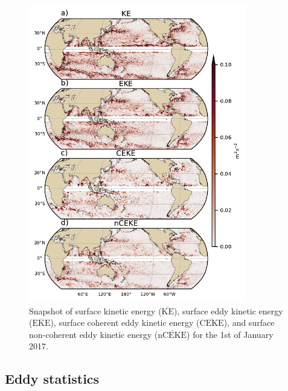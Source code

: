 \documentclass[draft,linenumbers]{agujournal2019}
\newcommand{\MKE}{\overline{\textrm{KE}}}
\newcommand{\MEKE}{\overline{\textrm{EKE}}}
\newcommand{\MCEKE}{\overline{\textrm{CEKE}}}
\newcommand{\MnCEKE}{\overline{\textrm{nCEKE}}}
\begin{document}
	\begin{figure}[t]
	    \centering
	    \includegraphics[width=95mm]{figures/snapshot_ke_maps_satellite_large.pdf}
	    \caption{Snapshot of surface kinetic energy ($\MKE$), surface eddy kinetic energy ($\MEKE$), surface coherent eddy kinetic energy ($\MCEKE$), and surface non-coherent eddy kinetic energy ($\MnCEKE$) for the 1st of January 2017.}
	    \label{fig:eddy_snapshot}
	\end{figure}

	\subsection{Eddy statistics}
\end{document}
